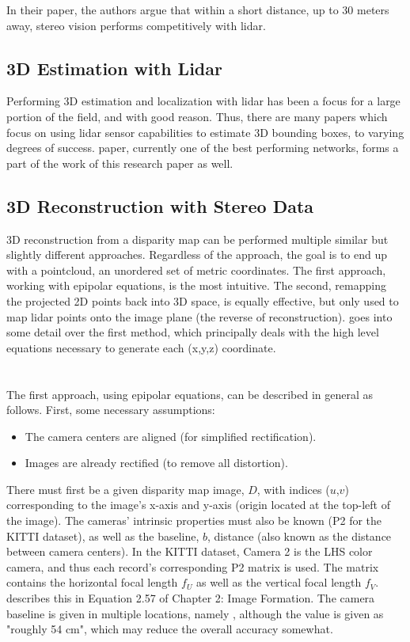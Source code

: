In their paper, the authors argue that within a short distance, up to 30 meters away, stereo vision performs competitively with lidar.

\subsection{3D Estimation with Lidar}
Performing 3D estimation and localization with lidar has been a focus for a large portion of the field, and with good reason. Thus, there are many papers which focus on using lidar sensor capabilities to estimate 3D bounding boxes, to varying degrees of success. \cite{qi_frustum_2017} paper, currently one of the best performing networks, forms a part of the work of this research paper as well.

\subsection{3D Reconstruction with Stereo Data}
\label{sect_reconstruct}
3D reconstruction from a disparity map can be performed multiple similar but slightly different approaches. Regardless of the approach, the goal is to end up with a pointcloud, an unordered set of metric coordinates. The first approach, working with epipolar equations, is the most intuitive. The second, remapping the projected 2D points back into 3D space, is equally effective, but only used to map lidar points onto the image plane (the reverse of reconstruction). \cite{szeliski_computer_2010} goes into some detail over the first method, which principally deals with the high level equations necessary to generate each (x,y,z) coordinate.
\\
\\
\\
The first approach, using epipolar equations, can be described in general as follows. First, some necessary assumptions:
\begin{itemize} \itemsep=-0.5em
    \item The camera centers are aligned (for simplified rectification).
    \item Images are already rectified (to remove all distortion).
\end{itemize}

There must first be a given disparity map image, $D$, with indices ($u$,$v$) corresponding to the image's x-axis and y-axis (origin located at the top-left of the image). The cameras' intrinsic properties must also be known (P2 for the KITTI dataset), as well as the baseline, $b$, distance (also known as the distance between camera centers). In the KITTI dataset, Camera 2 is the LHS color camera, and thus each record's corresponding P2 matrix is used. The matrix contains the horizontal focal length $f_U$ as well as the vertical focal length $f_V$. \cite{szeliski_computer_2010} describes this in Equation 2.57 of Chapter 2: Image Formation. The camera baseline is given in multiple locations, namely \cite{geiger_are_2012}, although the value is given as "roughly 54 cm", which may reduce the overall accuracy somewhat.

